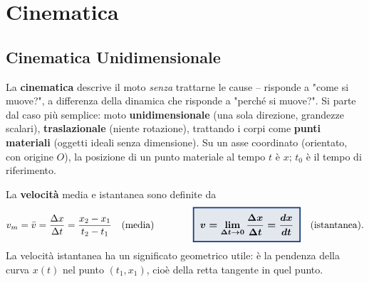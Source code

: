\documentclass[a4paper,11pt]{article}
\newcommand{\keyeq}[1]{{\setlength{\fboxsep}{6pt}\setlength{\fboxrule}{1.3pt}\fcolorbox{chapblue}{chapblue!12}{\boldmath$\displaystyle #1$}}}
\begin{document}
\newpage
\section{Cinematica}

\subsection{Cinematica Unidimensionale}

La \textbf{cinematica} descrive il moto \emph{senza} trattarne le cause -- risponde a "come si muove?", a differenza della dinamica che risponde a "perché si muove?". Si parte dal caso più semplice: moto \textbf{unidimensionale} (una sola direzione, grandezze scalari), \textbf{traslazionale} (niente rotazione), trattando i corpi come \textbf{punti materiali} (oggetti ideali senza dimensione). Su un asse coordinato (orientato, con origine $O$), la posizione di un punto materiale al tempo $t$ è $x$; $t_0$ è il tempo di riferimento.

La \textbf{velocità} media e istantanea sono definite da
\[
v_m = \bar v = \frac{\Delta x}{\Delta t} = \frac{x_2-x_1}{t_2-t_1} \quad \text{(media)} \qquad\qquad \keyeq{v = \lim_{\Delta t \to 0}\frac{\Delta x}{\Delta t} = \frac{dx}{dt}} \quad \text{(istantanea)}.
\]
La velocità istantanea ha un significato geometrico utile: è la pendenza della curva $x(t)$ nel punto $(t_1,x_1)$, cioè della retta tangente in quel punto.

\begin{center}
\end{center}
\end{document}
